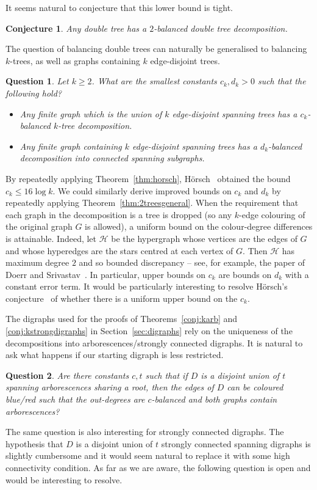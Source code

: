 \documentclass[11pt, reqno, a4paper]{article}
\newtheorem{conjecture}[theorem]{Conjecture}
\newtheorem{question}{Question}
\theoremstyle{definition}
\numberwithin{equation}{section}
\renewcommand{\leq}{\leqslant}
\renewcommand{\geq}{\geqslant}
\begin{document}
It seems natural to conjecture that this lower bound is tight.
\begin{conjecture}
Any double tree has a $2$-balanced double tree decomposition.
\end{conjecture}

The question of balancing double trees can naturally be generalised to balancing $k$-trees, as well as graphs containing $k$ edge-disjoint trees.
\begin{question}\label{qu:general}
Let $k\geq 2$.
What are the smallest constants $c_k, d_k>0$ such that the following hold?
\begin{itemize}
\item Any finite graph which is the union of $k$ edge-disjoint spanning trees has a \mbox{$c_k$-balanced} $k$-tree decomposition.
\item Any finite graph  
containing $k$ edge-disjoint spanning trees has a $d_k$-balanced decomposition into connected spanning subgraphs. 
\end{itemize}
\end{question}
By repeatedly applying Theorem~\ref{thm:horsch}, H\"orsch~\cite{horsch2021globally} obtained the bound \(c_k \leq 16\log k\). 
We could similarly derive improved bounds on \(c_k\) and \(d_k\) by repeatedly applying Theorem~\ref{thm:2treesgeneral}. 
When the requirement that each graph in the decomposition is a tree is dropped (so any \(k\)-edge colouring of the original graph \(G\) is allowed), a uniform bound on the colour-degree differences is attainable. 
Indeed, let \(\mathcal{H}\) be the hypergraph whose vertices are the edges of \(G\) and whose hyperedges are the stars centred at each vertex of \(G\). 
Then \(\mathcal{H}\) has maximum degree \(2\) and so bounded discrepancy -- see, for example, the paper of Doerr and Srivastav~\cite[Theorem~3.7]{ds2003}. In particular, upper bounds on $c_k$ are bounds on $d_k$ with a constant error term.
It would be particularly interesting to resolve H\"{o}rsch's conjecture~\cite{horsch2021globally} of whether there is a uniform upper bound on the \(c_k\).

The digraphs used for the proofs of Theorems~\ref{conj:karb} and \ref{conj:kstrongdigraphs} in Section~\ref{sec:digraphs} rely on the uniqueness of the decompositions into arborescences/strongly connected digraphs.
It is natural to ask what happens if our starting digraph is less restricted.
\begin{question}
Are there constants $c,t$ such that if $D$ is a disjoint union of $t$ spanning arborescences sharing a root, then the edges of $D$ can be coloured blue/red such that the out-degrees are $c$-balanced and both graphs contain arborescences?
\end{question}
The same question is also interesting for strongly connected digraphs. The hypothesis that $D$ is a disjoint union of $t$ strongly connected spanning digraphs is slightly cumbersome and it would seem natural to replace it with some high connectivity condition. As far as we are aware, the following question is open and would be interesting to resolve.
\end{document}
